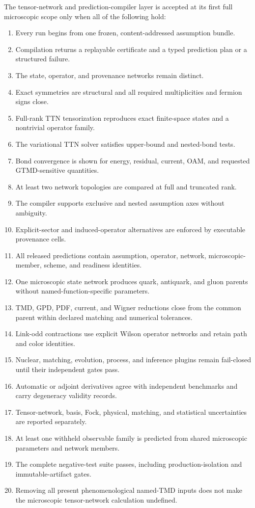 \documentclass[11pt]{article}
\begin{document}
The tensor-network and prediction-compiler layer is accepted at its first full
microscopic scope only when all of the following hold:
\begin{enumerate}
 \item Every run begins from one frozen, content-addressed assumption bundle.
 \item Compilation returns a replayable certificate and a typed prediction
 plan or a structured failure.
 \item The state, operator, and provenance networks remain distinct.
 \item Exact symmetries are structural and all required multiplicities and
 fermion signs close.
 \item Full-rank TTN tensorization reproduces exact finite-space states and a
 nontrivial operator family.
 \item The variational TTN solver satisfies upper-bound and nested-bond tests.
 \item Bond convergence is shown for energy, residual, current, OAM, and
 requested GTMD-sensitive quantities.
 \item At least two network topologies are compared at full and truncated rank.
 \item The compiler supports exclusive and nested assumption axes without
 ambiguity.
 \item Explicit-sector and induced-operator alternatives are enforced by
 executable provenance cells.
 \item All released predictions contain assumption, operator, network,
 microscopic-member, scheme, and readiness identities.
 \item One microscopic state network produces quark, antiquark, and gluon
 parents without named-function-specific parameters.
 \item TMD, GPD, PDF, current, and Wigner reductions close from the common
 parent within declared matching and numerical tolerances.
 \item Link-odd contractions use explicit Wilson operator networks and retain
 path and color identities.
 \item Nuclear, matching, evolution, process, and inference plugins remain
 fail-closed until their independent gates pass.
 \item Automatic or adjoint derivatives agree with independent benchmarks and
 carry degeneracy validity records.
 \item Tensor-network, basis, Fock, physical, matching, and statistical
 uncertainties are reported separately.
 \item At least one withheld observable family is predicted from shared
 microscopic parameters and network members.
 \item The complete negative-test suite passes, including production-isolation
 and immutable-artifact gates.
 \item Removing all present phenomenological named-TMD inputs does not make the
 microscopic tensor-network calculation undefined.
\end{enumerate}
\end{document}
